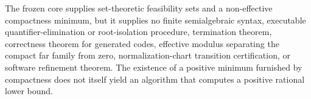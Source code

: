 The frozen core supplies set-theoretic feasibility sets and a non-effective compactness minimum, but it supplies no finite semialgebraic syntax, executable quantifier-elimination or root-isolation procedure, termination theorem, correctness theorem for generated codes, effective modulus separating the compact far family from zero, normalization-chart transition certification, or software refinement theorem. The existence of a positive minimum furnished by compactness does not itself yield an algorithm that computes a positive rational lower bound.